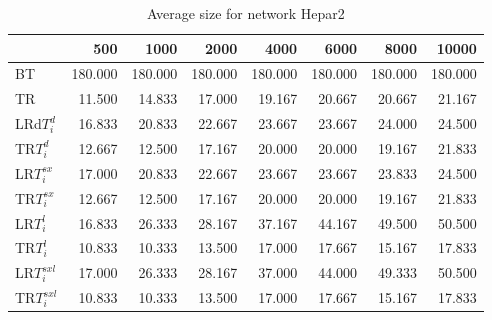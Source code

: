 \begin{table}
\begin{center}
\begin{tabular}{lrrrrrrr}
 & 500 &  1000 & 2000 & 4000 & 6000& 8000&  10000\\\hline
BT & 180.000 & 180.000 & 180.000 & 180.000 & 180.000 & 180.000 & 180.000\\\hline
TR & 11.500 & 14.833 & 17.000 & 19.167 & 20.667 & 20.667 & 21.167\\\hline
LRd$T_i^d$ & 16.833 & 20.833 & 22.667 & 23.667 & 23.667 & 24.000 & 24.500\\\hline
TR$T_i^d$ & 12.667 & 12.500 & 17.167 & 20.000 & 20.000 & 19.167 & 21.833\\\hline
LR$T_i^{sx}$ & 17.000 & 20.833 & 22.667 & 23.667 & 23.667 & 23.833 & 24.500\\\hline
TR$T_i^{sx}$ & 12.667 & 12.500 & 17.167 & 20.000 & 20.000 & 19.167 & 21.833\\\hline
LR$T_i^l$ & 16.833 & 26.333 & 28.167 & 37.167 & 44.167 & 49.500 & 50.500\\\hline
TR$T_i^l$ & 10.833 & 10.333 & 13.500 & 17.000 & 17.667 & 15.167 & 17.833\\\hline
LR$T_i^{sxl}$ & 17.000 & 26.333 & 28.167 & 37.000 & 44.000 & 49.333 & 50.500\\\hline
TR$T_i^{sxl}$ & 10.833 & 10.333 & 13.500 & 17.000 & 17.667 & 15.167 & 17.833\\\hline
\end{tabular}
\end{center}
\caption{Average size for network Hepar2 }
\label{Hepar2si}
\end{table}


